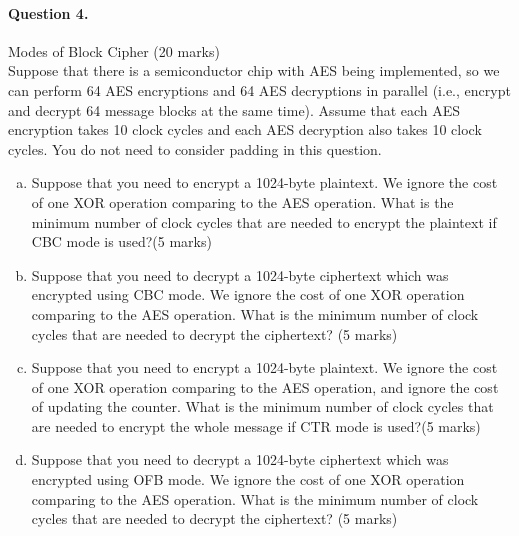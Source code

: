 \documentclass[12pt]{article}
\begin{document}
\paragraph{Question 4.}   Modes of Block Cipher \hfill (20 marks)\\
Suppose that there is a semiconductor chip with AES being implemented, so we can perform 64 AES encryptions and 64 AES decryptions in parallel (i.e., encrypt and decrypt 64 message blocks at the same time). Assume that each AES encryption takes 10 clock cycles and each AES decryption also takes 10 clock cycles. You do not need to consider padding in this question.
\begin{enumerate}[(a)]
\item Suppose that you need to encrypt a 1024-byte plaintext. We ignore the cost of one XOR operation comparing to the AES operation. What is the minimum number of clock cycles that are needed to encrypt the plaintext if CBC mode is used?\hfill (5 marks)
\item Suppose that you need to decrypt a 1024-byte ciphertext which was encrypted using CBC mode. We ignore the cost of one XOR operation comparing to the AES operation. What is the minimum number of clock cycles that are needed to decrypt the ciphertext? \hfill (5 marks)
\item Suppose that you need to encrypt a 1024-byte plaintext. We ignore the cost of one XOR operation comparing to the AES operation, and ignore the cost of updating the counter. What is the minimum number of clock cycles that are needed to encrypt the whole message if CTR mode is used?\hfill (5 marks)
\item Suppose that you need to decrypt a 1024-byte ciphertext which was encrypted using OFB mode. We ignore the cost of one XOR operation comparing to the AES operation. What is the minimum number of clock cycles that are needed to decrypt the ciphertext? \hfill (5 marks)
\end{enumerate}
\end{document}
